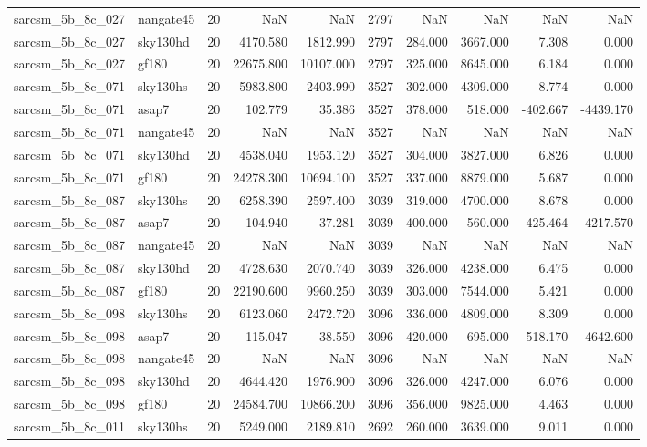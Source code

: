 \begin{longtable}{llrrrrrrrr}
sarcsm\_5b\_8c\_027 & nangate45 & 20 & NaN & NaN & 2797 & NaN & NaN & NaN & NaN \\
sarcsm\_5b\_8c\_027 & sky130hd & 20 & 4170.580 & 1812.990 & 2797 & 284.000 & 3667.000 & 7.308 & 0.000 \\
sarcsm\_5b\_8c\_027 & gf180 & 20 & 22675.800 & 10107.000 & 2797 & 325.000 & 8645.000 & 6.184 & 0.000 \\
sarcsm\_5b\_8c\_071 & sky130hs & 20 & 5983.800 & 2403.990 & 3527 & 302.000 & 4309.000 & 8.774 & 0.000 \\
sarcsm\_5b\_8c\_071 & asap7 & 20 & 102.779 & 35.386 & 3527 & 378.000 & 518.000 & -402.667 & -4439.170 \\
sarcsm\_5b\_8c\_071 & nangate45 & 20 & NaN & NaN & 3527 & NaN & NaN & NaN & NaN \\
sarcsm\_5b\_8c\_071 & sky130hd & 20 & 4538.040 & 1953.120 & 3527 & 304.000 & 3827.000 & 6.826 & 0.000 \\
sarcsm\_5b\_8c\_071 & gf180 & 20 & 24278.300 & 10694.100 & 3527 & 337.000 & 8879.000 & 5.687 & 0.000 \\
sarcsm\_5b\_8c\_087 & sky130hs & 20 & 6258.390 & 2597.400 & 3039 & 319.000 & 4700.000 & 8.678 & 0.000 \\
sarcsm\_5b\_8c\_087 & asap7 & 20 & 104.940 & 37.281 & 3039 & 400.000 & 560.000 & -425.464 & -4217.570 \\
sarcsm\_5b\_8c\_087 & nangate45 & 20 & NaN & NaN & 3039 & NaN & NaN & NaN & NaN \\
sarcsm\_5b\_8c\_087 & sky130hd & 20 & 4728.630 & 2070.740 & 3039 & 326.000 & 4238.000 & 6.475 & 0.000 \\
sarcsm\_5b\_8c\_087 & gf180 & 20 & 22190.600 & 9960.250 & 3039 & 303.000 & 7544.000 & 5.421 & 0.000 \\
sarcsm\_5b\_8c\_098 & sky130hs & 20 & 6123.060 & 2472.720 & 3096 & 336.000 & 4809.000 & 8.309 & 0.000 \\
sarcsm\_5b\_8c\_098 & asap7 & 20 & 115.047 & 38.550 & 3096 & 420.000 & 695.000 & -518.170 & -4642.600 \\
sarcsm\_5b\_8c\_098 & nangate45 & 20 & NaN & NaN & 3096 & NaN & NaN & NaN & NaN \\
sarcsm\_5b\_8c\_098 & sky130hd & 20 & 4644.420 & 1976.900 & 3096 & 326.000 & 4247.000 & 6.076 & 0.000 \\
sarcsm\_5b\_8c\_098 & gf180 & 20 & 24584.700 & 10866.200 & 3096 & 356.000 & 9825.000 & 4.463 & 0.000 \\
sarcsm\_5b\_8c\_011 & sky130hs & 20 & 5249.000 & 2189.810 & 2692 & 260.000 & 3639.000 & 9.011 & 0.000 \\

\end{longtable}
